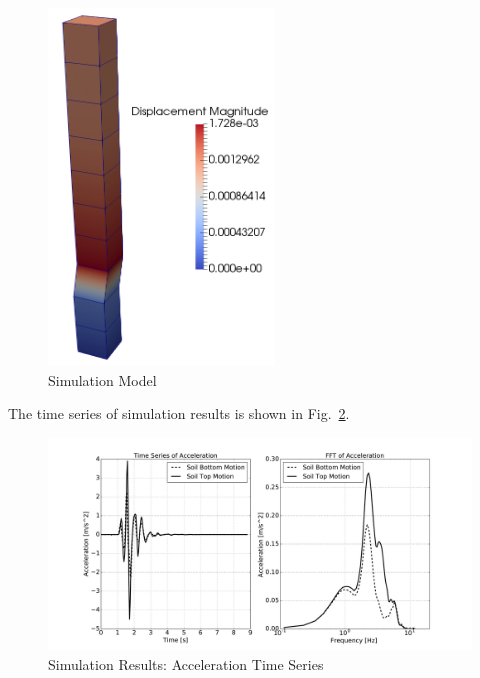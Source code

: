 \begin{figure}[H]
  \centering
  \includegraphics[width = 6cm]{./Figure-files/nonlinear_analysis_steps/free_field_1D/DRM1D_Motion3D.png}
  \caption{Simulation Model}
  \label{fig_decon_3D_motion_1D_model_results}
\end{figure}


The time series of simulation results is shown in Fig.~\ref{fig_decon_3D_motion_1D_model_results_top_bottom_time_series}.
\begin{figure}[H]
  \centering
  \includegraphics[width = 15cm]{./Figure-files/nonlinear_analysis_steps/free_field_1D/DRM1D_motion_node_5_x_acce_compare.pdf}
  \caption{Simulation Results: Acceleration Time Series}
  \label{fig_decon_3D_motion_1D_model_results_top_bottom_time_series}
\end{figure}

